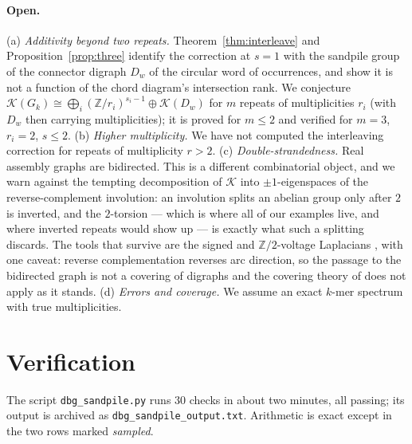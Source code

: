 \documentclass[11pt]{article}
\theoremstyle{plain}
\theoremstyle{definition}
\theoremstyle{remark}
\newcommand{\Z}{\mathbb{Z}}
\newcommand{\K}{\mathcal{K}}
\begin{document}
\paragraph{Open.} (a) \emph{Additivity beyond two repeats.} Theorem~\ref{thm:interleave}
and Proposition~\ref{prop:three} identify the correction at $s=1$ with the sandpile group
of the connector digraph $D_w$ of the circular word of occurrences, and show it is not a
function of the chord diagram's intersection rank. We conjecture
$\K(G_k)\cong\bigoplus_i(\Z/r_i)^{s_i-1}\oplus\K(D_w)$ for $m$ repeats of multiplicities
$r_i$ (with $D_w$ then carrying multiplicities); it is proved for $m\le2$ and verified for
$m=3$, $r_i=2$, $s\le2$. (b) \emph{Higher multiplicity.} We have not
computed the interleaving correction for repeats of multiplicity $r>2$. (c)
\emph{Double-strandedness.} Real assembly graphs are bidirected. This is a different
combinatorial object, and we warn against the tempting decomposition of $\K$ into
$\pm1$-eigenspaces of the reverse-complement involution: an involution splits an abelian
group only after $2$ is inverted, and the $2$-torsion --- which is where all of our
examples live, and where inverted repeats would show up --- is exactly what such a
splitting discards. The tools that survive are the signed and $\Z/2$-voltage Laplacians
\cite{Zaslavsky,RT}, with one caveat: reverse complementation reverses arc direction, so
the passage to the bidirected graph is not a covering of digraphs and the covering theory
of \cite{RT} does not apply as it stands. (d) \emph{Errors and coverage.} We assume an exact $k$-mer spectrum
with true multiplicities.

\section{Verification}\label{sec:battery}

The script \texttt{dbg\_sandpile.py} runs $30$ checks in about two minutes, all passing; its
output is archived as \texttt{dbg\_sandpile\_output.txt}. Arithmetic is exact except in the
two rows marked \emph{sampled}.
\end{document}
